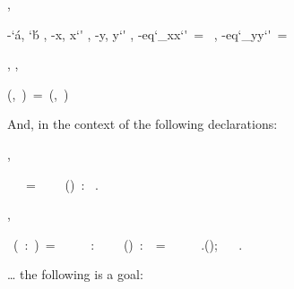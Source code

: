 \documentclass[a4paper]{article}
\begin{document}
\begin{alectryon}
  \sep
  \begin{sentence}
    \begin{output}
      \begin{goals}
        \begin{goal}
          \begin{hyps}
            \hyp{\char`\'a, \char`\'b}{}
            \sep
            \hyp{x, x\char`\'}{}
            \sep
            \hyp{y, y\char`\'}{}
            \sep
            \hyp{eq\char`\_xx\char`\'}{~=~}
            \sep
            \hyp{eq\char`\_yy\char`\'}{~=~}
          \end{hyps}
          \sep
          \infrule{}
          \sep
          \begin{conclusion}
            (,~)~=~(,~)
          \end{conclusion}
        \end{goal}
      \end{goals}
    \end{output}
  \end{sentence}
\end{alectryon}

And, in the context of the following declarations:

\begin{alectryon}
  \sep
  \begin{sentence}
    \begin{input}
      ~~~=~\PYZob{}\nl
      ~~~()~:~\nl
      \PYZcb{}.\nl
    \end{input}
  \end{sentence}
  \sep
  \begin{sentence}
    \begin{input}
      ~(~:~)~=~\PYZob{}\nl
      ~~~~:~\nl
      ~~~()~:~~=~\PYZob{}\nl
      ~~~~.();\nl
      ~~\PYZcb{}\nl
      \PYZcb{}.
    \end{input}
  \end{sentence}
\end{alectryon}

… the following is a goal:
\end{document}
